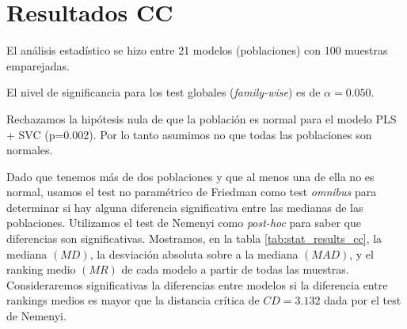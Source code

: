 \documentclass[a4paper,oneside,11pt,leqno]{article}
\begin{document}
	
	\section{Resultados CC}
	\label{sec:results_cc}
	
	El análisis estadístico se hizo entre 21 modelos (poblaciones) con 100 muestras emparejadas.
	
	El nivel de significancia para los test globales (\textit{family-wise}) es de $\alpha=0.050$.
	
	Rechazamos la hipótesis nula de que la población es normal para el modelo PLS + SVC (p=0.002). Por lo tanto asumimos no que todas las poblaciones son normales.
	
	Dado que tenemos más de dos poblaciones y que al menos una de ella no es normal, usamos el test no paramétrico de Friedman como test \textit{omnibus} para determinar si hay alguna diferencia significativa entre las medianas de las poblaciones. Utilizamos el test de Nemenyi como \textit{post-hoc} para saber que diferencias son significativas. Mostramos, en la tabla \ref{tab:stat_results_cc}, la mediana $(MD)$, la desviación absoluta sobre a la mediana $(MAD)$, y el ranking medio $(MR)$ de cada modelo a partir de todas las muestras. Consideraremos significativas la diferencias entre modelos si la diferencia entre rankings medios es mayor que la distancia crítica de $CD=3.132$ dada por el test de Nemenyi.
	
\end{document}
